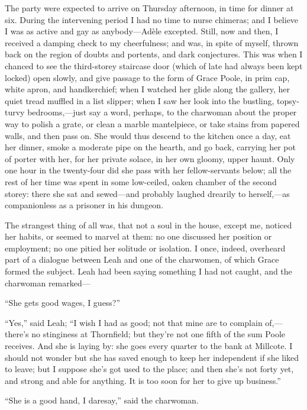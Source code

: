 The party were expected to arrive on Thursday afternoon, in time for
dinner at six. During the intervening period I had no time to nurse
chimeras; and I believe I was as active and gay as anybody---Adèle
excepted. Still, now and then, I received a damping check to my
cheerfulness; and was, in spite of myself, thrown back on the region of
doubts and portents, and dark conjectures. This was when I chanced to
see the third-storey staircase door (which of late had always been kept
locked) open slowly, and give passage to the form of Grace Poole, in
prim cap, white apron, and handkerchief; when I watched her glide along
the gallery, her quiet tread muffled in a list slipper; when I saw her
look into the bustling, topsy-turvy bedrooms,---just say a word,
perhaps, to the charwoman about the proper way to polish a grate, or
clean a marble mantelpiece, or take stains from papered walls, and then
pass on. She would thus descend to the kitchen once a day, eat her
dinner, smoke a moderate pipe on the hearth, and go back, carrying her
pot of porter with her, for her private solace, in her own gloomy, upper
haunt. Only one hour in the twenty-four did she pass with her
fellow-servants below; all the rest of her time was spent in some
low-ceiled, oaken chamber of the second storey: there she sat and
sewed---and probably laughed drearily to herself,---as companionless as
a prisoner in his dungeon.

The strangest thing of all was, that not a soul in the house, except me,
noticed her habits, or seemed to marvel at them: no one discussed her
position or employment; no one pitied her solitude or isolation. I
once, indeed, overheard part of a dialogue between Leah and one of the
charwomen, of which Grace formed the subject. Leah had been saying
something I had not caught, and the charwoman remarked---

\enquote{She gets good wages, I guess?}

\enquote{Yes,} said Leah; \enquote{I wish I had as good; not that mine
are to complain of,---there's no stinginess at Thornfield; but they're
not one fifth of the sum \Mrs{} Poole receives. And she is laying by: she
goes every quarter to the bank at Millcote. I should not wonder but she
has saved enough to keep her independent if she liked to leave; but I
suppose she's got used to the place; and then she's not forty yet, and
strong and able for anything. It is too soon for her to give up
business.}

\enquote{She is a good hand, I daresay,} said the charwoman.

